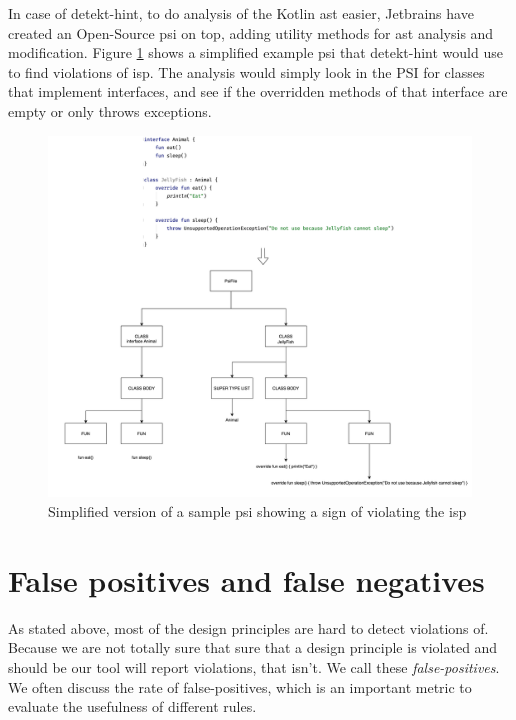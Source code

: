 \documentclass{report}
\begin{document}
In case of detekt-hint, to do analysis of the Kotlin \gls{ast} easier, Jetbrains\cite{jetbrains} have created an Open-Source \gls{psi} on top, adding utility methods for \gls{ast} analysis and modification. Figure \ref{fig:psi} shows a simplified example \gls{psi} that detekt-hint would use to find violations of \gls{isp}. The analysis would simply look in the PSI for classes that implement interfaces, and see if the overridden methods of that interface are empty or only throws exceptions. 

\begin{figure}[h!]
    \centering
    \includegraphics[width=\linewidth]{report/images/psi.png}
    \caption{Simplified version of a sample \gls{psi} showing a sign of violating the \gls{isp}}
    \label{fig:psi}
\end{figure}




\section{False positives and false negatives}
As stated above, most of the design principles are hard to detect violations of. Because we are not totally sure that sure that a design principle is violated and should be our tool will report violations, that isn't. We call these \textit{false-positives}. We often discuss the rate of false-positives, which is an important metric to evaluate the usefulness of different rules.
\end{document}
